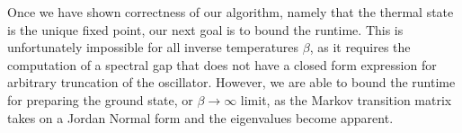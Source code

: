 \documentclass{article}
\begin{document}
Once we have shown correctness of our algorithm, namely that the thermal state is the unique fixed point, our next goal is to bound the runtime. This is unfortunately impossible for all inverse temperatures $\beta$, as it requires the computation of a spectral gap that does not have a closed form expression for arbitrary truncation of the oscillator. However, we are able to bound the runtime for preparing the ground state, or $\beta \to \infty$ limit, as the Markov transition matrix takes on a Jordan Normal form and the eigenvalues become apparent.  

\end{document}
